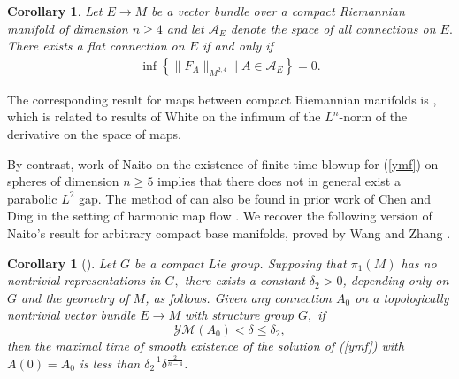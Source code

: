\documentclass[12pt]{amsart}
\newcommand{\YM}{\mathcal{YM}}
\renewcommand{\1}{{\mathbf 1}}
\newcommand{\calA}{\mathcal{A}}
\newcommand{\eps}{{\varepsilon}}
\newtheorem{cor}[thm]{Corollary}
\theoremstyle{others}
\numberwithin{equation}{section}
\begin{document}
\begin{cor}
Let $E \to M$ be a vector bundle over a compact %
Riemannian manifold of dimension $n \geq 4$ and let $\mathcal{A}_E$ denote the space of all connections on $E.$ %
There exists a flat connection on \(E\) if and only if
\begin{align*}
    \inf\left\{\|F_A\|_{M^{2, 4}} \mid A \in \mathcal{A}_E \right\} = 0.
\end{align*}

\end{cor}

The corresponding result for maps between compact Riemannian manifolds is \cite[Corollary 1.4]{estimatespaper}, which %
is related to results of White \cite[Cor. 2 and 3 on pg. 128]{whiteinfima} on the infimum of the $L^{n}$-norm of the derivative on the space of maps. %

By contrast, work of Naito \cite{naito} on the existence of finite-time blowup for (\ref{ymf}) on spheres of dimension $n \geq 5$ implies that there does not in general exist a parabolic \(L^2\) gap. The method of \cite{naito} can also be found in prior work of Chen and Ding in the setting of harmonic map flow \cite[Theorem 1.1]{chending}. We recover the following version of Naito's result for arbitrary compact base manifolds, proved by Wang and Zhang \cite{wangzhangfinitetimeblowupymf}.

\begin{cor}[{\cite[Theorem 1.1]{wangzhangfinitetimeblowupymf}}]\label{cor:Naito}
Let $G$ be a compact Lie group. Supposing that $\pi_1(M)$ has no nontrivial representations in $G,$ there exists a constant \(\delta_2 > 0\), depending only on $G$ %
and the geometry of \(M\), as follows. Given any connection $A_0$ on a topologically nontrivial vector bundle \(E \to M\) with structure group $G,$ if 
\begin{equation}\label{smallym}
\YM(A_0) < \delta \leq \delta_2,
\end{equation}
then the maximal time of smooth existence of the solution of (\ref{ymf}) with $A(0) = A_0$ is less than $\delta_2^{-1}\delta^{\frac{2}{n-4}}$.
\end{cor}
\end{document}
